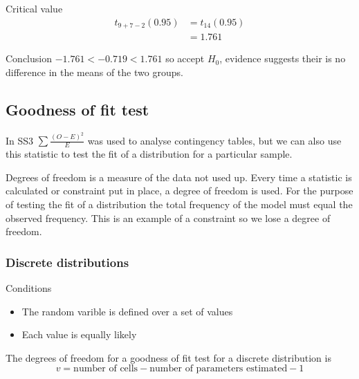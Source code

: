\begin{example}
            \begin{step}{Critical value}
            \begin{align*}
            t_{9 + 7 - 2}(0.95) &= t_{14}(0.95)\\ 
                                &= 1.761 
            \end{align*}
            \end{step}

            \begin{step}{Conclusion}
            $-1.761 < -0.719 < 1.761$ so accept $H_0$, evidence suggests their is no difference in the means of the two groups.
            \end{step}

            \end{example}


    \subsection{Goodness of fit test}
        In SS3 $\displaystyle\sum{\frac{(O - E)^2}{E}}$ was used to analyse contingency tables, but we can also use this statistic to test the fit of a distribution for a particular sample.

        Degrees of freedom is a measure of the data not used up. Every time a statistic is calculated or constraint put in place, a degree of freedom is used. For the purpose of testing the fit of a distribution the total frequency of the model must equal the observed frequency. This is an example of a constraint so we lose a degree of freedom.

        \subsubsection{Discrete distributions}
            Conditions
            \begin{itemize}
                \item The random varible is defined over a set of values
                \item Each value is equally likely
            \end{itemize}
            The degrees of freedom for a goodness of fit test for a discrete distribution is
            $$v = \text{number of cells} - \text{number of parameters estimated} - 1$$ 

